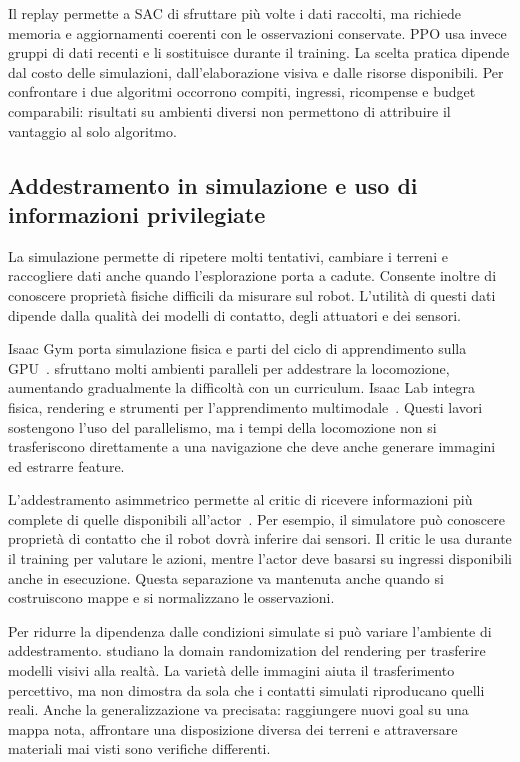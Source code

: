 Il replay permette a SAC di sfruttare più volte i dati raccolti, ma richiede memoria e aggiornamenti coerenti con le osservazioni conservate. PPO usa invece gruppi di dati recenti e li sostituisce durante il training. La scelta pratica dipende dal costo delle simulazioni, dall'elaborazione visiva e dalle risorse disponibili. Per confrontare i due algoritmi occorrono compiti, ingressi, ricompense e budget comparabili: risultati su ambienti diversi non permettono di attribuire il vantaggio al solo algoritmo.

\subsection{Addestramento in simulazione e uso di informazioni privilegiate}

La simulazione permette di ripetere molti tentativi, cambiare i terreni e raccogliere dati anche quando l'esplorazione porta a cadute. Consente inoltre di conoscere proprietà fisiche difficili da misurare sul robot. L'utilità di questi dati dipende dalla qualità dei modelli di contatto, degli attuatori e dei sensori.

Isaac Gym porta simulazione fisica e parti del ciclo di apprendimento sulla GPU~\citep{Makoviychuk2021IsaacGym}. \citet{Rudin2022Massively} sfruttano molti ambienti paralleli per addestrare la locomozione, aumentando gradualmente la difficoltà con un curriculum. Isaac Lab integra fisica, rendering e strumenti per l'apprendimento multimodale~\citep{Mittal2025IsaacLab}. Questi lavori sostengono l'uso del parallelismo, ma i tempi della locomozione non si trasferiscono direttamente a una navigazione che deve anche generare immagini ed estrarre feature.

L'addestramento asimmetrico permette al critic di ricevere informazioni più complete di quelle disponibili all'actor~\citep{Pinto2018Asymmetric}. Per esempio, il simulatore può conoscere proprietà di contatto che il robot dovrà inferire dai sensori. Il critic le usa durante il training per valutare le azioni, mentre l'actor deve basarsi su ingressi disponibili anche in esecuzione. Questa separazione va mantenuta anche quando si costruiscono mappe e si normalizzano le osservazioni.

Per ridurre la dipendenza dalle condizioni simulate si può variare l'ambiente di addestramento. \citet{Tobin2017Randomization} studiano la domain randomization del rendering per trasferire modelli visivi alla realtà. La varietà delle immagini aiuta il trasferimento percettivo, ma non dimostra da sola che i contatti simulati riproducano quelli reali. Anche la generalizzazione va precisata: raggiungere nuovi goal su una mappa nota, affrontare una disposizione diversa dei terreni e attraversare materiali mai visti sono verifiche differenti.

